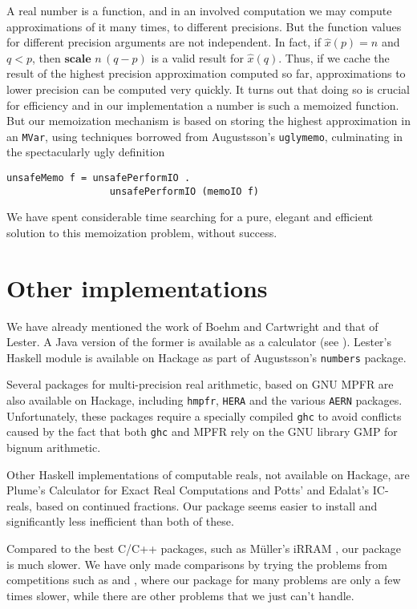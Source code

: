 \documentclass[9pt, a4, twocolumn]{article}
\begin{document}
A real number is a function, and in an involved computation we may
compute approximations of it many times, to different precisions.  But 
the function values for different precision arguments are not
independent. In fact, if $\hat{x}(p)  = n$ and $q < p$, then
$\textbf{scale} \, \, n \, (q-p)$ is a valid result for $\hat{x}(q)$. Thus, if
we cache the result of the highest precision approximation computed so
far, approximations to lower precision can be computed very quickly.
It turns out that doing so is crucial for efficiency and in our
implementation a number is such a memoized function. But our
memoization mechanism is based on storing the highest approximation in
an \texttt{MVar}, using techniques borrowed from Augustsson's
\texttt{uglymemo}, culminating in the spectacularly ugly definition
\begin{verbatim}
unsafeMemo f = unsafePerformIO . 
                  unsafePerformIO (memoIO f)
\end{verbatim}
 We have spent considerable time searching for a
pure, elegant and efficient solution to this memoization problem, without success.

\section{Other implementations}

We have already mentioned the work of Boehm and Cartwright and that of
Lester. A Java version of the former is available as a calculator (see
\cite{BoehmJava}). Lester's Haskell module is available on Hackage as
part of Augustsson's \texttt{numbers} package. 

Several packages for multi-precision real arithmetic, based on GNU
MPFR  are also available on
Hackage, including \texttt{hmpfr}, \texttt{HERA} and the various
\texttt{AERN} packages. Unfortunately, these
  packages require a specially compiled \texttt{ghc} to avoid
  conflicts caused by the fact that both \texttt{ghc} and MPFR rely
 on the GNU library GMP for bignum arithmetic.
 
Other Haskell implementations of computable reals, not available on Hackage, are Plume's
Calculator for Exact Real Computations and Potts' and Edalat's
IC-reals, based on continued fractions. Our package seems easier
to install and significantly less inefficient than both of these.

Compared to the best C/C++ packages, such as M\"uller's iRRAM \cite{irram},
our package is much slower. We have only made comparisons by trying the
problems from competitions such as \cite{many} and \cite{more}, where 
our package for many problems are only a few times slower, while there are
other problems that we just can't handle.
\end{document}
